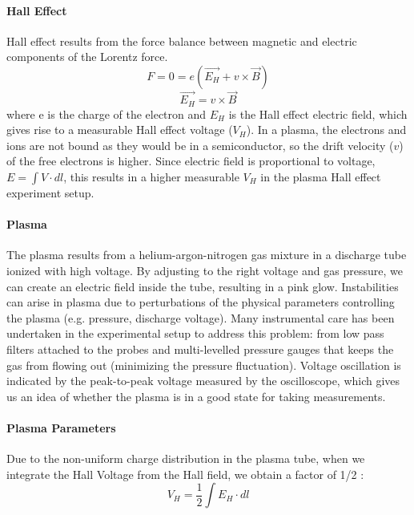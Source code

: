\documentclass{sigchi}
\begin{document}
\paragraph{Hall Effect} Hall effect results from the force balance between magnetic and electric components of the Lorentz force.
\begin{equation}
F = 0 = e(\vec{E_H}+v\times\vec{B})
\end{equation}
\begin{equation}
\vec{E_H} = v\times\vec{B}
\label{EHBV}
\end{equation}
where e is the charge of the electron and $E_H$ is the Hall effect electric field, which gives rise to a measurable Hall effect voltage ($V_H$).  In a plasma, the electrons and ions are not bound as they would be in a semiconductor, so the drift velocity ($v$) of the free electrons is higher. Since electric field is proportional to voltage, $E = \int V\cdot dl$, this results in a higher measurable $V_H$ in the plasma Hall effect experiment setup\cite{4_hall effect in plasma_1981}. 

\paragraph{Plasma} The plasma results from a helium-argon-nitrogen gas mixture in a discharge tube ionized with high voltage. By adjusting to the right voltage and gas pressure, we can create an electric field inside the tube, resulting in a pink glow. Instabilities can arise in plasma due to perturbations of the physical parameters controlling the plasma (e.g. pressure, discharge voltage)\cite{5_franklin_1976}. Many instrumental care has been undertaken in the experimental setup to address this problem: from low pass filters attached to the probes and multi-levelled pressure gauges that keeps the gas from flowing out (minimizing the pressure fluctuation). Voltage oscillation is indicated by the peak-to-peak voltage measured by the oscilloscope, which gives us an idea of whether the plasma is in a good state for taking measurements.

\paragraph{Plasma Parameters \label{sec:plasma_param_theory}} Due to the non-uniform charge distribution in the plasma tube, when we integrate the Hall Voltage from the Hall field, we obtain a factor of 1/2 :
\begin{equation}
V_H = \frac{1}{2} \int E_H \cdot dl
\end{equation}
\end{document}
